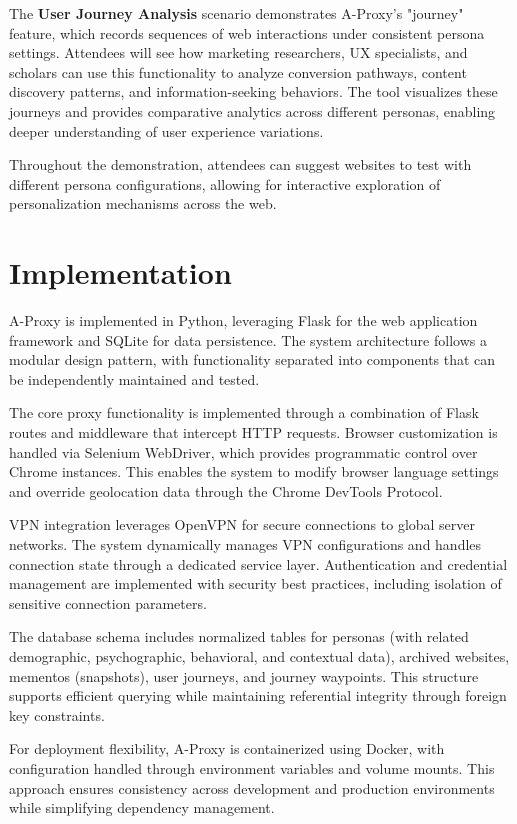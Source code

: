 \documentclass[sigconf]{acmart}
\begin{document}
The \textbf{User Journey Analysis} scenario demonstrates A-Proxy's "journey" feature, which records sequences of web interactions under consistent persona settings. Attendees will see how marketing researchers, UX specialists, and scholars can use this functionality to analyze conversion pathways, content discovery patterns, and information-seeking behaviors. The tool visualizes these journeys and provides comparative analytics across different personas, enabling deeper understanding of user experience variations.

Throughout the demonstration, attendees can suggest websites to test with different persona configurations, allowing for interactive exploration of personalization mechanisms across the web.

\section{Implementation}
A-Proxy is implemented in Python, leveraging Flask for the web application framework and SQLite for data persistence. The system architecture follows a modular design pattern, with functionality separated into components that can be independently maintained and tested.

The core proxy functionality is implemented through a combination of Flask routes and middleware that intercept HTTP requests. Browser customization is handled via Selenium WebDriver, which provides programmatic control over Chrome instances. This enables the system to modify browser language settings and override geolocation data through the Chrome DevTools Protocol.

VPN integration leverages OpenVPN for secure connections to global server networks. The system dynamically manages VPN configurations and handles connection state through a dedicated service layer. Authentication and credential management are implemented with security best practices, including isolation of sensitive connection parameters.

The database schema includes normalized tables for personas (with related demographic, psychographic, behavioral, and contextual data), archived websites, mementos (snapshots), user journeys, and journey waypoints. This structure supports efficient querying while maintaining referential integrity through foreign key constraints.

For deployment flexibility, A-Proxy is containerized using Docker, with configuration handled through environment variables and volume mounts. This approach ensures consistency across development and production environments while simplifying dependency management.
\end{document}
